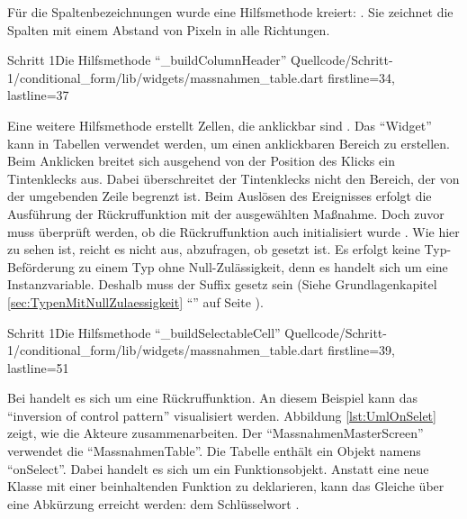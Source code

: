   Für die Spaltenbezeichnungen wurde eine Hilfsmethode kreiert:  \Lst{\ref{lst:Schritt1buildColumnHeader}}.
  Sie zeichnet die Spalten mit einem Abstand von  Pixeln in alle Richtungen.

  \begin{alexlisting}{Schritt 1}{Die Hilfsmethode \enquote{_buildColumnHeader}}
    {Quellcode/Schritt-1/conditional_form/lib/widgets/massnahmen_table.dart}
    {firstline=34, lastline=37}
    \label{lst:Schritt1buildColumnHeader}
  \end{alexlisting}

  Eine weitere Hilfsmethode  erstellt Zellen, die anklickbar sind \Lst{\ref{lst:Schritt1buildSelectableCell}}.
  Das \enquote{Widget}   kann in Tabellen verwendet werden, um einen anklickbaren Bereich zu erstellen.
  Beim  Anklicken breitet sich ausgehend von der Position des Klicks ein Tintenklecks  aus.
  Dabei überschreitet der Tintenklecks nicht den Bereich, der von der umgebenden Zeile begrenzt ist.
  Beim Auslösen des Ereignisses  erfolgt die Ausführung der Rückruffunktion   mit der ausgewählten Maßnahme.
  Doch zuvor muss überprüft werden,
  ob die Rückruffunktion auch initialisiert wurde .
  Wie hier zu sehen ist, reicht es nicht aus, abzufragen, ob   gesetzt ist.
  Es erfolgt keine Typ-Beförderung zu einem Typ ohne Null-Zulässigkeit, denn es handelt sich um eine Instanzvariable.
  Deshalb muss der Suffix \IC{!} gesetz sein  (Siehe Grundlagenkapitel \ref{sec:TypenMitNullZulaessigkeit} \enquote{} auf Seite \pageref{sec:TypenMitNullZulaessigkeit}).
  
  \begin{alexlisting}{Schritt 1}{Die Hilfsmethode \enquote{_buildSelectableCell}}
    {Quellcode/Schritt-1/conditional_form/lib/widgets/massnahmen_table.dart}
    {firstline=39, lastline=51}
    \label{lst:Schritt1buildSelectableCell}
  \end{alexlisting}

  \clearpage
  Bei  handelt es sich um eine Rückruffunktion.
  An diesem Beispiel kann das \enquote{inversion of control pattern} visualisiert werden.
  Abbildung \ref{lst:UmlOnSelet} zeigt, wie die Akteure zusammenarbeiten.
  Der \enquote{MassnahmenMasterScreen} verwendet die \enquote{MassnahmenTable}.
  Die Tabelle enthält ein Objekt namens \enquote{onSelect}.
  Dabei handelt es sich um ein Funktionsobjekt.
  Anstatt eine neue Klasse mit einer beinhaltenden Funktion zu deklarieren, kann das Gleiche über eine Abkürzung erreicht werden:
  dem Schlüsselwort  \Lst{\ref{lst:Schritt1TypedefOnSelectCallback}}.
  
